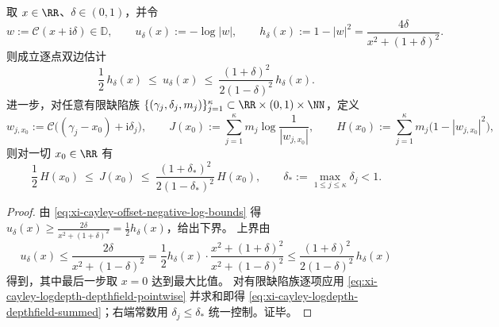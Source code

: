 \begin{corollary}[对数深度与共动深度场的逐点可比性]\label{cor:xi-cayley-logdepth-vs-depthfield-comparability}
取 \(x\in\RR\)、\(\delta\in(0,1)\)，并令
\[
w:=\mathcal C(x+\mathrm{i}\delta)\in\mathbb D,
\qquad
u_\delta(x):=-\log|w|,
\qquad
h_\delta(x):=1-|w|^2=\frac{4\delta}{x^2+(1+\delta)^2}.
\]
则成立逐点双边估计
\begin{equation}\label{eq:xi-cayley-logdepth-depthfield-pointwise}
\boxed{\;
\frac12\,h_\delta(x)\ \le\ u_\delta(x)\ \le\ \frac{(1+\delta)^2}{2(1-\delta)^2}\,h_\delta(x).\;}
\end{equation}
进一步，对任意有限缺陷族 \(\{(\gamma_j,\delta_j,m_j)\}_{j=1}^{\kappa}\subset\RR\times(0,1)\times\NN\)，定义
\[
w_{j,x_0}:=\mathcal C\bigl((\gamma_j-x_0)+\mathrm{i}\delta_j\bigr),
\qquad
J(x_0):=\sum_{j=1}^{\kappa}m_j\log\frac{1}{|w_{j,x_0}|},
\qquad
H(x_0):=\sum_{j=1}^{\kappa}m_j\bigl(1-|w_{j,x_0}|^2\bigr),
\]
则对一切 \(x_0\in\RR\) 有
\begin{equation}\label{eq:xi-cayley-logdepth-depthfield-summed}
\boxed{\;
\frac12\,H(x_0)\ \le\ J(x_0)\ \le\ \frac{(1+\delta_\ast)^2}{2(1-\delta_\ast)^2}\,H(x_0),\qquad
\delta_\ast:=\max_{1\le j\le\kappa}\delta_j<1.\;}
\end{equation}
\end{corollary}
\begin{proof}
由 \eqref{eq:xi-cayley-offset-negative-log-bounds} 得
\(
u_\delta(x)\ge \frac{2\delta}{x^2+(1+\delta)^2}=\frac12 h_\delta(x)
\)，给出下界。
上界由
\[
u_\delta(x)\le \frac{2\delta}{x^2+(1-\delta)^2}
=\frac12 h_\delta(x)\cdot\frac{x^2+(1+\delta)^2}{x^2+(1-\delta)^2}
\le \frac{(1+\delta)^2}{2(1-\delta)^2}\,h_\delta(x)
\]
得到，其中最后一步取 \(x=0\) 达到最大比值。
对有限缺陷族逐项应用 \eqref{eq:xi-cayley-logdepth-depthfield-pointwise} 并求和即得
\eqref{eq:xi-cayley-logdepth-depthfield-summed}；右端常数用 \(\delta_j\le \delta_\ast\) 统一控制。证毕。
\end{proof}

\endinput
